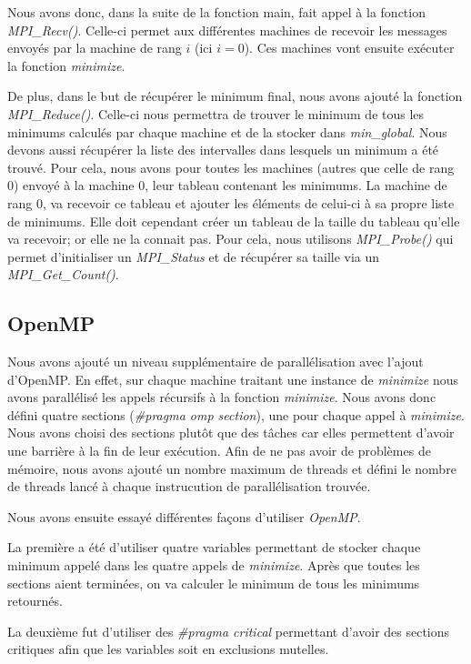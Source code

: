 \documentclass[a4paper,10pt]{article}
\begin{document}
Nous avons donc, dans la suite de la fonction main, fait appel à la fonction \emph{MPI\_Recv()}. Celle-ci permet aux différentes machines de recevoir les messages envoyés par la machine de rang $i$ (ici $i=0$). Ces machines vont ensuite exécuter la fonction \emph{minimize}. 

De plus, dans le but de récupérer le minimum final, nous avons ajouté la fonction \emph{MPI\_Reduce()}. Celle-ci nous permettra de trouver le minimum de tous les minimums calculés par chaque machine et de la stocker dans \emph{min\_global}.
Nous devons aussi récupérer la liste des intervalles dans lesquels un minimum a été trouvé. Pour cela, nous avons pour toutes les machines (autres que celle de rang 0) envoyé à la machine 0, leur tableau contenant les minimums. La machine de rang 0, va recevoir ce tableau et ajouter les éléments de celui-ci à sa propre liste de minimums. Elle doit cependant créer un tableau de la taille du tableau qu'elle va recevoir; or elle ne la connait pas. Pour cela, nous utilisons \emph{MPI\_Probe()} qui permet d'initialiser un \emph{MPI\_Status} et de récupérer sa taille via un \emph{MPI\_Get\_Count()}.

\subsection{OpenMP}
Nous avons ajouté un niveau supplémentaire de parallélisation avec l'ajout d'OpenMP. En effet, sur chaque machine traitant une instance de \emph{minimize} nous avons parallélisé les appels récursifs à la fonction \emph{minimize}. 
Nous avons donc défini quatre sections (\emph{\#pragma omp section}), une pour chaque appel à \emph{minimize}. Nous avons choisi des sections plutôt que des tâches car elles permettent d'avoir une barrière à la fin de leur exécution.
Afin de ne pas avoir de problèmes de mémoire, nous avons ajouté un nombre maximum de threads et défini le nombre de threads lancé à chaque instrucution de parallélisation trouvée.

Nous avons ensuite essayé différentes façons d'utiliser \emph{OpenMP}.

La première a été d'utiliser quatre variables permettant de stocker chaque minimum appelé dans les quatre appels de \emph{minimize}. Après que toutes les sections aient terminées, on va calculer le minimum de tous les minimums retournés.

La deuxième fut d'utiliser des \emph{\#pragma critical} permettant d'avoir des sections critiques afin que les variables soit en exclusions mutelles.
\end{document}
